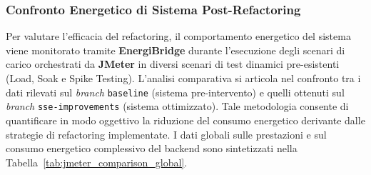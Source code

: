 \subsubsection{Confronto Energetico di Sistema Post-Refactoring}

Per valutare l'efficacia del refactoring, il comportamento energetico del sistema viene monitorato tramite \textbf{EnergiBridge} durante l'esecuzione degli scenari di carico orchestrati da \textbf{JMeter} in diversi scenari di test dinamici pre-esistenti (Load, Soak e Spike Testing). L'analisi comparativa si articola nel confronto tra i dati rilevati sul \textit{branch} \texttt{baseline} (sistema pre-intervento) e quelli ottenuti sul \textit{branch} \texttt{sse-improvements} (sistema ottimizzato). Tale metodologia consente di quantificare in modo oggettivo la riduzione del consumo energetico derivante dalle strategie di refactoring implementate. I dati globali sulle prestazioni e sul consumo energetico complessivo del backend sono sintetizzati nella Tabella~\ref{tab:jmeter_comparison_global}.

